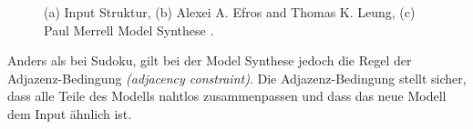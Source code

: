 \documentclass[12pt, a4paper,twoside,openright]{report} %
\begin{document}
\begin{figure}[H]
    \centering
    \qquad
    \qquad
    \caption{(a) Input Struktur, (b) Alexei A. Efros and Thomas K. Leung, (c) Paul Merrell Model Synthese \cite{merrell2009model}.}%
\end{figure}

Anders als bei Sudoku, gilt bei der Model Synthese jedoch die Regel der Adjazenz-Bedingung \textit{(adjacency constraint)}.
Die Adjazenz-Bedingung stellt sicher, dass alle Teile des Modells nahtlos zusammenpassen und dass das neue Modell dem Input ähnlich ist.
\end{document}

